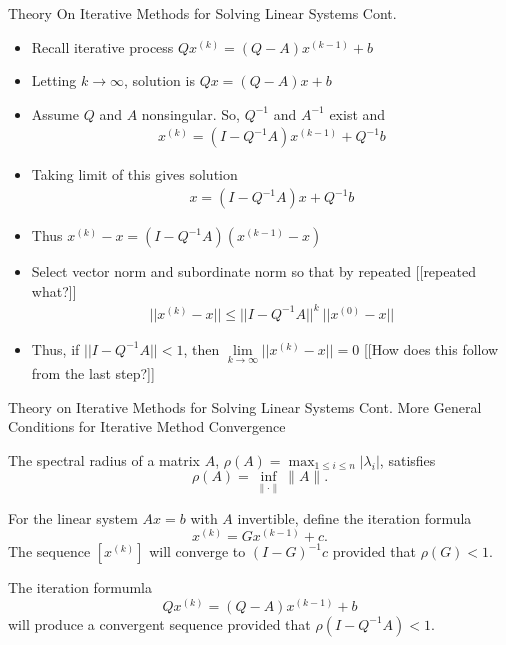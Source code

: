 \documentclass[9pt, serif]{beamer}
\newlength{\wideitemsep}
\let\olditem\item
\renewcommand{\item}{\setlength{\itemsep}{\wideitemsep}\olditem}
\newcommand{\bi}{\begin{itemize}}
\newcommand{\ei}{\end{itemize}}
\newcommand{\abs}[1]{\lvert#1\rvert}
\newcommand{\norm}[1]{\lVert#1\rVert}
\begin{document}
\begin{frame}{Theory On Iterative Methods for Solving Linear Systems Cont.}
    \bi
        \item Recall iterative process $Qx^{(k)} = (Q - A)x^{(k-1)} + b$ \pause
        \item Letting $k\rightarrow\infty$, solution is $Qx = (Q - A)x + b$ \pause
        \item Assume $Q$ and $A$ nonsingular. So, $Q^{-1}$ and $A^{-1}$ exist and
	    \begin{align*}
	        x^{(k)} = (I - Q^{-1}A)x^{(k-1)} + Q^{-1}b
	    \end{align*}
        \pause
        \item Taking limit of this gives solution
	    \begin{align*}
	        x = (I-Q^{-1}A)x+Q^{-1}b
	    \end{align*}
        \pause


        \item Thus $x^{(k)} - x = (I-Q^{-1}A)(x^{(k-1)}-x)$ \pause
        \item Select vector norm and subordinate norm so that by repeated [[repeated what?]]
	    \begin{align*}
	        ||x^{(k)} - x|| \leq || I -Q^{-1}A||^k~||x^{(0)}-x||
	    \end{align*}
        \pause
        \item Thus, if $|| I - Q^{-1}A|| < 1$, then $\lim\limits_{k\rightarrow\infty} ||x^{(k)} - x || = 0$ [[How does this follow from the last step?]]
    \ei
\end{frame}


\begin{frame}{Theory on Iterative Methods for Solving Linear Systems Cont.}
    More General Conditions for Iterative Method Convergence \pause
    \begin{theorem}
        The spectral radius of a matrix $A$, $\rho(A) = \max_{1\le i\le n}\abs{\lambda_i}$, satisfies $$\rho(A) = \inf_{\norm{\cdot}}\norm{A}.$$
    \end{theorem} 
    \pause
    \begin{theorem}
        For the linear system $Ax = b$ with $A$ invertible, define the iteration formula $$x^{(k)} = Gx^{(k-1)} + c.$$
        The sequence $\left[x^{(k)}\right]$ will converge to $(I - G)^{-1}c$ provided that $\rho(G) < 1$.
    \end{theorem}
    \pause
    \begin{corollary}
        The iteration formumla $$Qx^{(k)} = (Q-A)x^{(k-1)}+b$$ will produce a convergent sequence provided that $\rho(I-Q^{-1}A) < 1$.
    \end{corollary} 
\end{frame}
\end{document}
